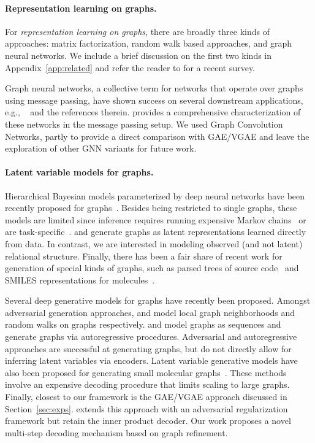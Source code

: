 \documentclass{article}
\begin{document}
\paragraph{Representation learning on graphs.}
For \textit{representation learning on graphs}, there are broadly three kinds of approaches: matrix factorization, random walk based approaches, and graph neural networks. We include a brief discussion on the first two kinds in Appendix~\ref{app:related} and refer the reader to \citet{hamilton2017representation} for a recent survey. 


Graph neural networks, a collective term for networks that operate over graphs using message passing, have shown success on several downstream applications, e.g., ~\citep{duvenaud2015molecular,li2015gated,kearnes2016molecular,kipf2016semi,hamilton2017inductive} and the references therein. \citet{gilmer2017neural} provides a comprehensive characterization of these networks in the message passing setup. We used Graph Convolution Networks, partly to provide a direct comparison with GAE/VGAE and leave the exploration of other GNN variants for future work.

\paragraph{Latent variable models for graphs.} Hierarchical Bayesian models parameterized by deep neural networks have been recently proposed for graphs~\citep{hu2017deep,wang2017relational}. Besides being restricted to single graphs, these models are limited since inference requires running expensive Markov chains~\citep{hu2017deep} or are task-specific~\citep{wang2017relational}. \citet{johnson2017transitions} and \citet{kipf2018neural} generate graphs as latent representations learned directly from data. In contrast, we are interested in modeling observed (and not latent) relational structure. Finally, there has been a fair share of recent work for generation of special kinds of graphs, such as parsed trees of source code~\citep{maddison2014structured} and SMILES representations  for molecules~\citep{olivecrona2017denovo}. 

 Several deep generative models for graphs have recently been proposed. Amongst adversarial generation approaches, \citet{wang2017graphgan} and \citet{bojchevski2018netgan} model local graph neighborhoods and random walks on graphs respectively. \citet{li2018learning} and \citet{you2018graphrnn} model graphs as sequences and generate graphs via autoregressive procedures. Adversarial and autoregressive approaches are successful at generating graphs, but do not directly allow for inferring latent variables via encoders. Latent variable generative models have also been proposed for generating small molecular graphs~\citep{jin2018junction,samanta2018designing,simonovsky2018graphvae}. These methods involve an expensive decoding procedure that limits scaling to large graphs. Finally, closest to our framework is the GAE/VGAE approach \citep{kipf2016variational} discussed in Section~\ref{sec:exps}. \citet{pan2018adversarially} extends this approach with an adversarial regularization framework but retain the inner product decoder. Our work proposes a novel multi-step decoding mechanism based on graph refinement.
 
\end{document}
